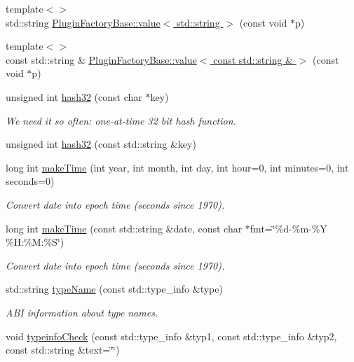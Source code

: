 \begin{DoxyCompactItemize}
{\footnotesize template$<$$>$ }\\std::string \hyperlink{namespace_d_d4hep_a5b5167e44073fdcee5af1fdcb724d8f1}{PluginFactoryBase::value$<$ std::string $>$} (const void $\ast$p)
\item 
{\footnotesize template$<$$>$ }\\const std::string \& \hyperlink{namespace_d_d4hep_a6d3b9a78f7f80ec6ee1366b7769f3b1d}{PluginFactoryBase::value$<$ const std::string \& $>$} (const void $\ast$p)
\item 
unsigned int \hyperlink{namespace_d_d4hep_a64c38e1f6b17efb9177457a3f2690daa}{hash32} (const char $\ast$key)
\begin{DoxyCompactList}\small\item\em We need it so often: one-\/at-\/time 32 bit hash function. \item\end{DoxyCompactList}\item 
unsigned int \hyperlink{namespace_d_d4hep_a856fab7f400a9e8c0e3f999f933d3883}{hash32} (const std::string \&key)
\item 
long int \hyperlink{namespace_d_d4hep_ae99d8100ffc43cc104f89aae55187f11}{makeTime} (int year, int month, int day, int hour=0, int minutes=0, int seconds=0)
\begin{DoxyCompactList}\small\item\em Convert date into epoch time (seconds since 1970). \item\end{DoxyCompactList}\item 
long int \hyperlink{namespace_d_d4hep_adf6475d1fb2f6f99ec94fd7bbcae5e49}{makeTime} (const std::string \&date, const char $\ast$fmt=\char`\"{}\%d-\/\%m-\/\%Y \%H:\%M:\%S\char`\"{})
\begin{DoxyCompactList}\small\item\em Convert date into epoch time (seconds since 1970). \item\end{DoxyCompactList}\item 
std::string \hyperlink{namespace_d_d4hep_aac3aec612736d0521670ca2e7b1305bd}{typeName} (const std::type\_\-info \&type)
\begin{DoxyCompactList}\small\item\em ABI information about type names. \item\end{DoxyCompactList}\item 
void \hyperlink{namespace_d_d4hep_ad28e7066d6a18fdd0422755c43425883}{typeinfoCheck} (const std::type\_\-info \&typ1, const std::type\_\-info \&typ2, const std::string \&text=\char`\"{}\char`\"{})

\end{DoxyCompactItemize}
